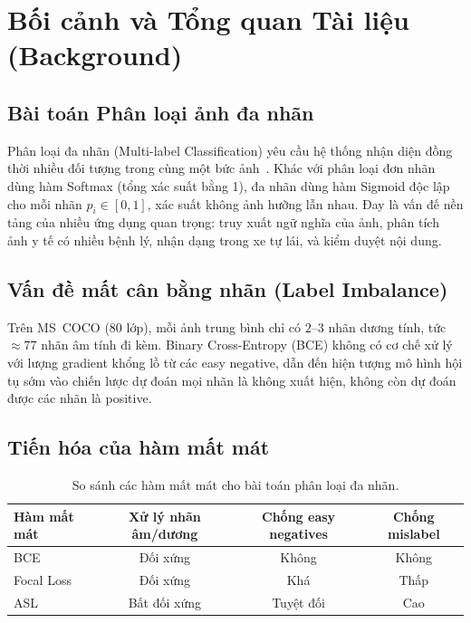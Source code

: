 \documentclass{article}
\begin{document}
\section{Bối cảnh và Tổng quan Tài liệu (Background)}

\subsection{Bài toán Phân loại ảnh đa nhãn}

Phân loại đa nhãn (Multi-label Classification) yêu cầu hệ thống nhận diện đồng
thời nhiều đối tượng trong cùng một bức ảnh~\cite{zhang2014review}.
Khác với phân loại đơn nhãn dùng hàm Softmax (tổng xác suất bằng 1), đa nhãn
dùng hàm Sigmoid độc lập cho mỗi nhãn $p_i \in [0,1]$, xác suất không ảnh hưỡng lẫn nhau.
Đay là vấn đế nền tảng của nhiều ứng dụng quan trọng: truy xuất ngữ nghĩa của ảnh,
phân tích ảnh y tế có nhiều bệnh lý, nhận dạng trong xe tự lái, và kiểm duyệt nội dung.

\subsection{Vấn đề mất cân bằng nhãn (Label Imbalance)}

Trên MS~COCO (80 lớp), mỗi ảnh trung bình chỉ có $2$--$3$ nhãn dương tính, tức
$\approx 77$ nhãn âm tính đi kèm. Binary Cross-Entropy (BCE) không có cơ chế
xử lý với lượng gradient khổng lồ từ các easy negative, dẫn đến hiện tượng mô hình hội tụ sớm vào chiến lược dự đoán mọi
nhãn là không xuất hiện, không còn dự đoán được các nhãn là positive.

\subsection{Tiến hóa của hàm mất mát}

\begin{table}[H]
  \caption{So sánh các hàm mất mát cho bài toán phân loại đa nhãn.}
  \label{tab:loss_compare}
  \centering
  \small
  \begin{tabular}{lccc}
    \toprule
    \textbf{Hàm mất mát} & \textbf{Xử lý nhãn âm/dương} & \textbf{Chống easy negatives} & \textbf{Chống mislabel} \\
    \midrule
    BCE~\cite{goodfellow2016dl}    & Đối xứng   & Không   & Không \\
    Focal Loss~\cite{lin2017focal} & Đối xứng   & Khá     & Thấp  \\
    ASL~\cite{ridnik2021asl}       & Bất đối xứng & Tuyệt đối & Cao   \\
    \bottomrule
  \end{tabular}
\end{table}
\end{document}
